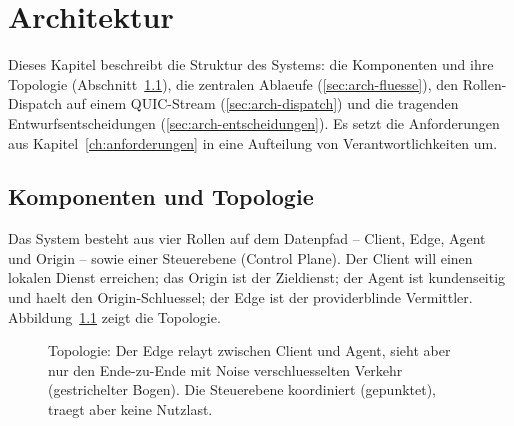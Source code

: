 \chapter{Architektur}
\label{ch:architektur}

Dieses Kapitel beschreibt die Struktur des Systems: die Komponenten und ihre
Topologie (Abschnitt~\ref{sec:arch-topologie}), die zentralen Ablaeufe
(\ref{sec:arch-fluesse}), den Rollen-Dispatch auf einem QUIC-Stream
(\ref{sec:arch-dispatch}) und die tragenden Entwurfsentscheidungen
(\ref{sec:arch-entscheidungen}). Es setzt die Anforderungen aus
Kapitel~\ref{ch:anforderungen} in eine Aufteilung von Verantwortlichkeiten um.

\section{Komponenten und Topologie}
\label{sec:arch-topologie}

Das System besteht aus vier Rollen auf dem Datenpfad -- Client, Edge, Agent und
Origin -- sowie einer Steuerebene (Control Plane). Der Client will einen lokalen
Dienst erreichen; das Origin ist der Zieldienst; der Agent ist kundenseitig und
haelt den Origin-Schluessel; der Edge ist der providerblinde Vermittler.
Abbildung~\ref{fig:topologie} zeigt die Topologie.

\begin{figure}[t]
  \centering
  \caption{Topologie: Der Edge relayt zwischen Client und Agent, sieht aber nur
  den Ende-zu-Ende mit Noise verschluesselten Verkehr (gestrichelter Bogen). Die
  Steuerebene koordiniert (gepunktet), traegt aber keine Nutzlast.}
  \label{fig:topologie}
\end{figure}

